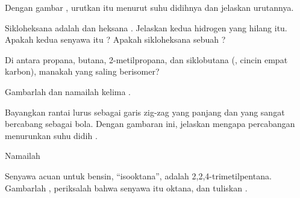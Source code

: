 \begin{exercise}[$\star\star$]\label{exo:g11:organic-skeletons:9}
Dengan gambar  , urutkan  itu menurut
suhu didihnya dan jelaskan urutannya.
\end{exercise}

\begin{exercise}[$\star\star$]\label{exo:g11:organic-skeletons:10}
Sikloheksana adalah  dan heksana . Jelaskan kedua
 hidrogen yang hilang itu. Apakah kedua senyawa itu ? Apakah
sikloheksana sebuah ?
\end{exercise}

\begin{exercise}[$\star\star$]\label{exo:g11:organic-skeletons:11}
Di antara propana, butana, 2-metilpropana, dan siklobutana (,
cincin empat  karbon), manakah yang saling berisomer?
\end{exercise}

\begin{exercise}[$\star\star\star$]\label{exo:g11:organic-skeletons:12}
Gambarlah dan namailah kelima  .
\end{exercise}

\begin{exercise}[$\star\star\star$]\label{exo:g11:organic-skeletons:13}
Bayangkan  rantai lurus sebagai garis zig-zag yang panjang dan
 yang sangat bercabang sebagai bola. Dengan gambaran ini, jelaskan
mengapa percabangan menurunkan suhu didih .
\end{exercise}

\begin{exercise}[$\star\star\star$]\label{exo:g11:organic-skeletons:14}
Namailah 
\begin{center}
\end{center}
\end{exercise}

\begin{exercise}[$\star\star\star$]\label{exo:g11:organic-skeletons:15}
Senyawa acuan untuk bensin, ``isooktana'', adalah
2,2,4-trimetilpentana. Gambarlah , periksalah bahwa
senyawa itu  oktana, dan tuliskan .
\end{exercise}

